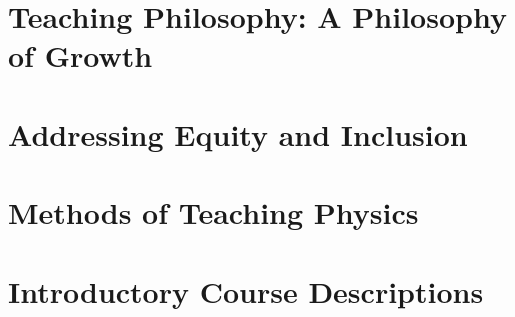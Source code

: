 \documentclass[../../main.tex]{subfiles}
\begin{document}
\label{sec:teaching}

\section{Teaching Philosophy: A Philosophy of Growth}

%

\begin{flushleft}

\end{flushleft}

\section{Addressing Equity and Inclusion}

%

\begin{flushleft}

\end{flushleft}

\section{Methods of Teaching Physics}

%

\begin{flushleft}

\end{flushleft}

\section{Introductory Course Descriptions}

%

\begin{flushleft}

\end{flushleft}
\end{document}
